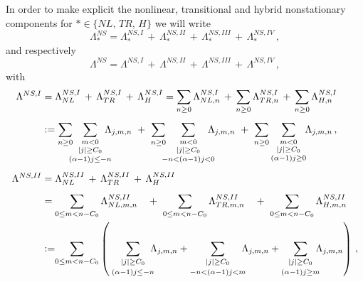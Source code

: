 \documentclass[a4paper,reqno]{amsart}
\numberwithin{equation}{section}
\theoremstyle{definition}
\def\a{\alpha}
\def\L{\Lambda}
\begin{document}
In order to make explicit the nonlinear, transitional and hybrid nonstationary components for ${*}\in\{NL,\,TR,\,H\}$ we will write
\begin{equation}
 \L^{NS}_{*}=\L^{NS,I}_{*}\,+\,\L^{NS, II}_{*}\,+\,\L^{NS, III}_{*}\,+\,\L^{NS, IV}_{*}\,,
\end{equation}
and respectively
\begin{equation}
 \L^{NS}=\L^{NS,I}\,+\,\L^{NS, II}\,+\,\L^{NS, III}\,+\,\L^{NS, IV}\,,
\end{equation}
with
\begin{align}
\L^{NS,I} &=\L^{NS,I}_{NL}\,+\,\L^{NS,I}_{TR}\,+\,\L^{NS,I}_{H}=\sum_{n\geq 0}  \L^{NS,I}_{NL,n}\,+\,\sum_{n\geq 0}  \L^{NS,I}_{TR,n}\,+\,\sum_{n\geq 0}\L^{NS,I}_{H,n}\nonumber\\[1ex]
&:=\sum_{n\geq 0}\hspace{-.2cm} \sum_{\substack{m<0\\[.1em]|j|\ge C_0\\[.1em](\a-1)j\leq -n}}\hspace{-.3cm} \L_{j,m,n}\,\,+\,\,
\sum_{n\geq 0}\hspace{-.2cm} \sum_{\substack{m<0\\[.1em]|j|\ge C_0\\[.1em] -n<(\a-1)j<0}}\hspace{-.3cm} \L_{j,m,n}\,\,+\,\,\sum_{n\geq 0} \sum_{\substack{m<0\\[.1ex]|j|\ge C_0\\[.1ex] (\a-1)j\geq 0}} \hspace{-.1cm} \L_{j,m,n}\,,\raisetag{1\baselineskip}\label{ns11}\\[1ex]
\L^{NS,II}&=\L^{NS,II}_{NL}\,+\,\L^{NS,II}_{TR}\,+\,\L^{NS,II}_{H}\nonumber\\[1ex]
&=\sum_{0\leq m<n-C_0}  \L^{NS,II}_{NL,m,n}\quad+\,\,\sum_{0\leq m<n-C_0}  \L^{NS,II}_{TR,m,n}\quad+\,\,\sum_{0\leq m<n-C_0}  \L^{NS,II}_{H,m,n}\nonumber\\
&:=\hspace{-.1cm}\sum_{0\leq m<n-C_0}
\left(\:
\sum_{\substack{|j|\ge C_0\\[.5ex](\a-1)j\leq-n }}\hspace{-.2cm} \L_{j,m,n}+
\sum_{\substack{|j|\ge C_0\\[.5ex]-n<(\a-1)j<m}}\hspace{-.2cm} \L_{j,m,n}+
\sum_{\substack{|j|\geq C_0\\[.5ex] (\a-1)j\geq m}}\hspace{-.2cm} \L_{j,m,n}
\right)\,, \label{ns21}\\[1ex]

\end{align}
\end{document}
